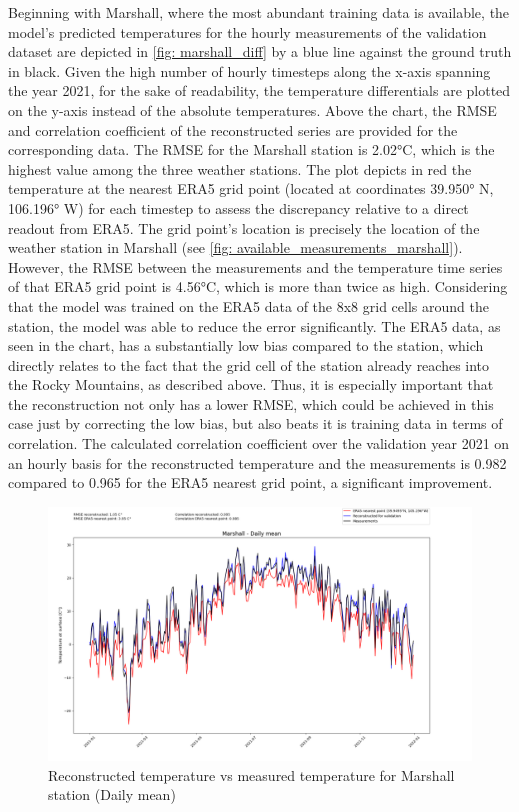 Beginning with Marshall, where the most abundant training data is available, the model's predicted temperatures for the hourly measurements of the validation dataset are depicted in \autoref{fig: marshall_diff} by a blue line against the ground truth in black.
Given the high number of hourly timesteps along the x-axis spanning the year 2021, for the sake of readability, the temperature differentials are plotted on the y-axis instead of the absolute temperatures.
Above the chart, the RMSE and correlation coefficient of the reconstructed series are provided for the corresponding data.
The RMSE for the Marshall station is 2.02°C, which is the highest value among the three weather stations.
The plot depicts in red the temperature at the nearest ERA5 grid point (located at coordinates 39.950° N, 106.196° W) for each timestep to assess the discrepancy relative to a direct readout from ERA5.
The grid point's location is precisely the location of the weather station in Marshall (see \autoref{fig: available_measurements_marshall}).
However, the RMSE between the measurements and the temperature time series of that ERA5 grid point is 4.56°C, which is more than twice as high.
Considering that the model was trained on the ERA5 data of the 8x8 grid cells around the station, the model was able to reduce the error significantly.
The ERA5 data, as seen in the chart, has a substantially low bias compared to the station, which directly relates to the fact that the grid cell of the station already reaches into the Rocky Mountains, as described above.
Thus, it is especially important that the reconstruction not only has a lower RMSE, which could be achieved in this case just by correcting the low bias, but also beats it is training data in terms of correlation.
The calculated correlation coefficient over the validation year 2021 on an hourly basis for the reconstructed temperature and the measurements is 0.982 compared to 0.965 for the ERA5 nearest grid point, a significant improvement.

\begin{figure}
    \centering
    \includegraphics[width=1.00\textwidth]{resources/images/charts/marshall_eval_grib_final/Marshall - Daily mean.png}
    \caption{Reconstructed temperature vs measured temperature for Marshall station (Daily mean)}
    \label{fig: marshall_daily}
\end{figure}

